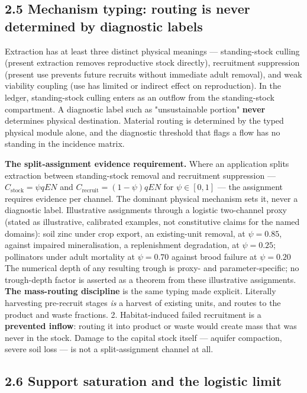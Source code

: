 \documentclass[11pt]{article}
\begin{document}
\subsection*{2.5 Mechanism typing: routing is never determined by diagnostic labels}\label{25-mechanism-typing-routing-is-never-determined-by-diagnostic-labels}

Extraction has at least three distinct physical meanings --- standing-stock culling (present extraction removes reproductive stock directly), recruitment suppression (present use prevents future recruits without immediate adult removal), and weak viability coupling (use has limited or indirect effect on reproduction). In the ledger, standing-stock culling enters as an outflow from the standing-stock compartment. A diagnostic label such as "unsustainable portion" \textbf{never} determines physical destination. Material routing is determined by the typed physical module alone, and the diagnostic threshold that flags a flow has no standing in the incidence matrix.

\textbf{The split-assignment evidence requirement.} Where an application splits extraction between standing-stock removal and recruitment suppression --- \(C_{\mathrm{stock}} = \psi qEN\) and \(C_{\mathrm{recruit}} =\allowbreak{} (1-\psi)qEN\) for \(\psi \in [0,1]\) --- the assignment requires evidence per channel. The dominant physical mechanism sets it, never a diagnostic label. Illustrative assignments through a logistic two-channel proxy (stated as illustrative, calibrated examples, not constitutive claims for the named domains): soil zinc under crop export, an existing-unit removal, at \(\psi = 0.85\), against impaired mineralisation, a replenishment degradation, at \(\psi = 0.25\); pollinators under adult mortality at \(\psi = 0.70\) against brood failure at \(\psi = 0.20\) The numerical depth of any resulting trough is proxy- and parameter-specific; no trough-depth factor is asserted as a theorem from these illustrative assignments. \textbf{The mass-routing discipline} is the same typing made explicit. Literally harvesting pre-recruit stages \emph{is} a harvest of existing units, and routes to the product and waste fractions. 2. Habitat-induced failed recruitment is a \textbf{prevented inflow}: routing it into product or waste would create mass that was never in the stock. Damage to the capital stock itself --- aquifer compaction, severe soil loss --- is not a split-assignment channel at all.

\subsection*{2.6 Support saturation and the logistic limit}\label{26-support-saturation-and-the-logistic-limit}
\end{document}
